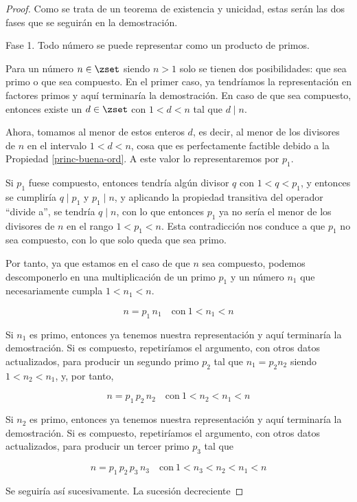 \begin{proof}
  Como se trata de un teorema de existencia y unicidad, estas serán las dos
  fases que se seguirán en la demostración.

  Fase 1. Todo número se puede representar como un producto de primos.

  Para un número $n \in \zset$ siendo $n > 1$ solo se tienen dos
  posibilidades: que sea primo o que sea compuesto. En el primer caso, ya
  tendríamos la representación en factores primos y aquí terminaría la
  demostración. En caso de que sea compuesto, entonces existe un $d \in
  \zset$ con $1 < d < n$ tal que $d \mid n$.

  Ahora, tomamos al menor de estos enteros $d$, es decir, al menor de los
  divisores de $n$ en el intervalo $1 < d < n$, cosa que es perfectamente
  factible debido a la Propiedad \ref{princ-buena-ord}. A este valor lo
  representaremos por $p_1$.

  Si $p_1$ fuese compuesto, entonces tendría algún divisor $q$ con $1 < q <
  p_1$, y entonces se cumpliría $q \mid p_1$ y $p_1 \mid n$, y aplicando la
  propiedad transitiva del operador ``divide a'', se tendría $q \mid n$, con
  lo que entonces $p_1$ ya no sería el menor de los divisores de $n$ en el
  rango $1 < p_1 < n$. Esta contradicción nos conduce a que $p_1$ no sea
  compuesto, con lo que solo queda que sea primo.

  Por tanto, ya que estamos en el caso de que $n$ sea compuesto, podemos
  descomponerlo en una multiplicación de un primo $p_1$ y un número $n_1$
  que necesariamente cumpla $1 < n_1 < n$.

  $$ n = p_1 \, n_1 \quad \text{con} \ 1 < n_1 < n $$

  Si $n_1$ es primo, entonces ya tenemos nuestra representación y aquí
  terminaría la demostración. Si es compuesto, repetiríamos el argumento,
  con otros datos actualizados, para producir un segundo primo $p_2$ tal que
  $n_1 = p_2 n_2$ siendo $1 < n_2 < n_1$, y, por tanto,

  $$ n = p_1 \, p_2 \, n_2 \quad \text{con} \ 1 < n_2 < n_1 < n $$

  Si $n_2$ es primo, entonces ya tenemos nuestra representación y aquí
  terminaría la demostración. Si es compuesto, repetiríamos el argumento,
  con otros datos actualizados, para producir un tercer primo $p_3$ tal que

  $$ n = p_1 \, p_2 \, p_3 \, n_3 \quad \text{con} \ 1 < n_3 < n_2 < n_1 < n
  $$

  Se seguiría así sucesivamente. La sucesión decreciente


\end{proof}
